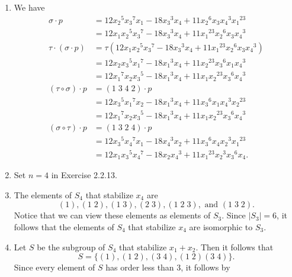 \begin{enumerate}
      \begin{enumerate}
         \item We have
               \begin{align*}
                  \sigma \cdot p &= 12{x_2}^5{x_3}^7x_1-18{x_3}^3x_4+11{x_2}^6
                        x_3{x_4}^3{x_1}^{23} \\
                     &= 12x_1{x_2}^5{x_3}^7-18{x_3}^3x_4+11{x_1}^{23}{x_2}^6
                        x_3{x_4}^3 \\
                  \tau \cdot (\sigma \cdot p) &= \tau(12x_1{x_2}^5{x_3}^7-
                        18{x_3}^3x_4+11{x_1}^{23}{x_2}^6x_3{x_4}^3) \\
                     &= 12x_2{x_3}^5{x_1}^7-18{x_1}^3x_4+11{x_2}^{23}{x_3}^6
                        x_1{x_4}^3 \\
                     &= 12{x_1}^7x_2{x_3}^5-18{x_1}^3x_4+11x_1{x_2}^{23}{x_3}^6
                        {x_4}^3 \\
                  (\tau\circ\sigma) \cdot p &= (1\;3\;4\;2) \cdot p \\
                     &= 12{x_3}^5{x_1}^7x_2 - 18{x_1}^3x_4 +
                        11{x_3}^6x_1{x_4}^3{x_2}^{23} \\
                     &= 12{x_1}^7x_2{x_3}^5 - 18{x_1}^3x_4 +
                        11x_1{x_2}^{23}{x_3}^6{x_4}^3 \\
                  (\sigma\circ\tau) \cdot p &= (1\;3\;2\;4) \cdot p \\
                     &= 12{x_3}^5{x_4}^7x_1 - 18{x_4}^3x_2 +
                        11{x_3}^6x_4{x_2}^3{x_1}^{23} \\
                     &= 12x_1{x_3}^5{x_4}^7 - 18x_2{x_4}^3 +
                        11{x_1}^{23}{x_2}^3{x_3}^6x_4.
               \end{align*}
         \item Set $n = 4$ in Exercise 2.2.13.
         \item The elements of $S_4$ that stabilize $x_4$ are
               $$(1),(1\;2),(1\;3), (2\;3), (1\;2\;3), \text{ and } (1\;3\;2).$$
               Notice that we can view these elements as elements of $S_3$.
               Since $|S_3| = 6$, it follows that the elements of $S_4$ that
               stabilize $x_4$ are isomorphic to $S_3$.
         \item Let $S$ be the subgroup of $S_4$ that stabilize $x_1+x_2$.
               Then it follows that
               $$S = \{(1),(1\;2),(3\;4), (1\;2)(3\;4)\}.$$
               Since every element of $S$ has order less than 3, it follows by

\end{enumerate}
\end{enumerate}
